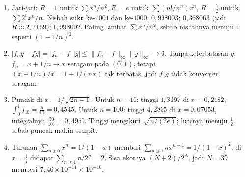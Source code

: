 \begin{enumerate}[label=\textbf{14.\arabic*}]
  \item Jari-jari: $R=1$ untuk $\sum x^{n}/n^{2}$, $R=e$ untuk
        $\sum(n!/n^{n})x^{n}$, $R=\tfrac12$ untuk $\sum2^{n}x^{n}/n$. Nisbah
        suku ke-$1001$ dan ke-$1000$: $0{,}998003$; $0{,}368063$ (jadi
        $R\approx2{,}7169$); $1{,}998002$. Paling lambat $\sum x^{n}/n^{2}$,
        sebab nisbahnya menuju $1$ seperti $(1-1/n)^{2}$.

  \item $\lvert f_{n}g-fg\rvert=\lvert f_{n}-f\rvert\,\lvert g\rvert
        \le\lVert f_{n}-f\rVert_{\infty}\lVert g\rVert_{\infty}\to0$. Tanpa
        keterbatasan $g$: $f_{n}=x+1/n\to x$ seragam pada $(0,1)$, tetapi
        $(x+1/n)/x=1+1/(nx)$ tak terbatas, jadi $f_{n}g$ tidak konvergen
        seragam.

  \item Puncak di $x=1/\sqrt{2n+1}$. Untuk $n=10$: tinggi $1{,}3397$ di
        $x=0{,}2182$, $\int_{0}^{1}f_{10}=\tfrac{5}{11}=0{,}4545$. Untuk
        $n=100$: tinggi $4{,}2835$ di $x=0{,}07053$, integralnya
        $\tfrac{50}{101}=0{,}4950$. Tinggi mengikuti $\sqrt{n/(2e)}$; luasnya
        menuju $\tfrac12$ sebab puncak makin sempit.

  \item Turunan $\sum_{n\ge0}x^{n}=1/(1-x)$ memberi
        $\sum_{n\ge1}nx^{n-1}=1/(1-x)^{2}$; di $x=\tfrac12$ didapat
        $\sum_{n\ge1}n/2^{n}=2$. Sisa ekornya $(N+2)/2^{N}$, jadi
        $N=39$ memberi $7{,}46\times10^{-11}<10^{-10}$.
\end{enumerate}


